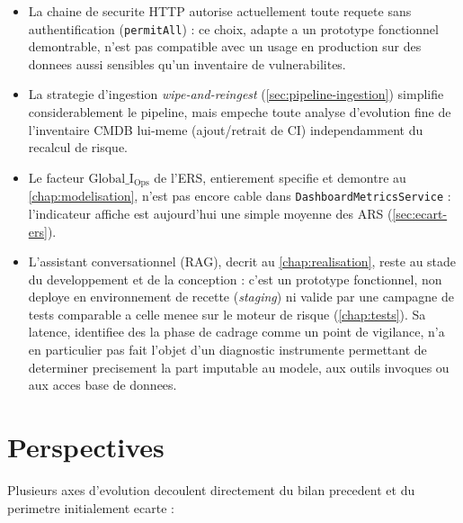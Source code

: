 \begin{itemize}
  \item La chaine de securite HTTP autorise actuellement toute requete sans
  authentification (\texttt{permitAll}) : ce choix, adapte a un prototype
  fonctionnel demontrable, n'est pas compatible avec un usage en production sur des
  donnees aussi sensibles qu'un inventaire de vulnerabilites.
  \item La strategie d'ingestion \emph{wipe-and-reingest} (\cref{sec:pipeline-ingestion})
  simplifie considerablement le pipeline, mais empeche toute analyse d'evolution fine
  de l'inventaire CMDB lui-meme (ajout/retrait de CI) independamment du recalcul de
  risque.
  \item Le facteur $\mathrm{Global\_I_{Ops}}$ de l'ERS, entierement specifie et
  demontre au \cref{chap:modelisation}, n'est pas encore cable dans
  \texttt{DashboardMetricsService} : l'indicateur affiche est aujourd'hui une simple
  moyenne des ARS (\cref{sec:ecart-ers}).
  \item L'assistant conversationnel (RAG), decrit au \cref{chap:realisation}, reste
  au stade du developpement et de la conception : c'est un prototype fonctionnel, non
  deploye en environnement de recette (\emph{staging}) ni valide par une campagne de
  tests comparable a celle menee sur le moteur de risque (\cref{chap:tests}). Sa
  latence, identifiee des la phase de cadrage comme un point de vigilance, n'a en
  particulier pas fait l'objet d'un diagnostic instrumente permettant de determiner
  precisement la part imputable au modele, aux outils invoques ou aux acces base de
  donnees.
\end{itemize}

\section*{Perspectives}
\label{sec:perspectives}

Plusieurs axes d'evolution decoulent directement du bilan precedent et du perimetre
initialement ecarte :

